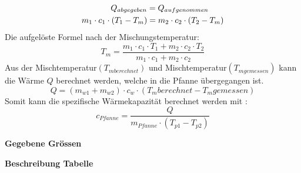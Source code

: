 \documentclass{article}
\begin{document}
\begin{equation}
\begin{split}
 Q_{abgegeben} = Q_{aufgenommen}\hspace{0.655cm}\\
 m_1\cdot c_1\cdot (T_1-T_m)=m_2\cdot c_2\cdot (T_2-T_m)
\end{split}
\end{equation}
Die aufgelöste Formel nach der Mischungstemperatur:
\begin{equation}
	T_m = \frac{m_1\cdot c_1\cdot T_1+m_2\cdot c_2\cdot T_2}{m_1\cdot c_1+m_2\cdot c_2}
\end{equation}
Aus der Mischtemperatur$(T_{mberechnet})$ und Mischtemperatur$(T_{mgemessen})$ kann die Wärme $Q$ berechnet werden, welche in die Pfanne übergegangen ist.
\begin{equation}
 Q = (m_{w1}+m_{w2}) \cdot c_w \cdot (T_m{berechnet}-T_m{gemessen})
\end{equation}
Somit kann die spezifische Wärmekapazität berechnet werden mit :
\begin{equation}
	c_{Pfanne} = \frac{Q}{m_{Pfanne} \cdot (T_{p1}-T_{p2}) }
\end{equation}

\textbf{Gegebene Grössen}

\textbf{Beschreibung Tabelle}
\end{document}
